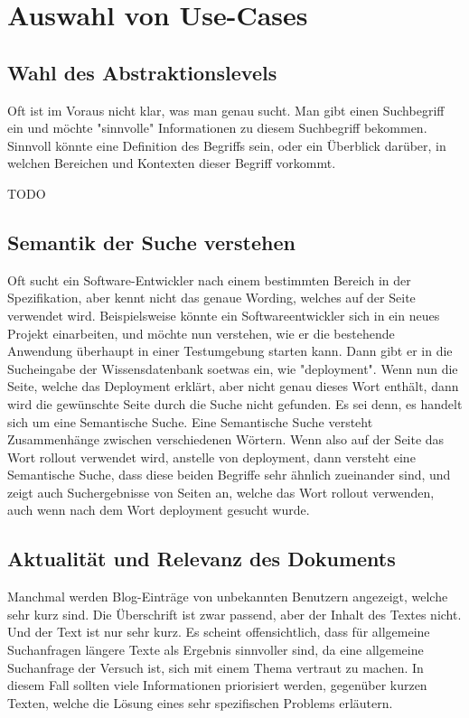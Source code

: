 \chapter{Auswahl von Use-Cases}

\section{Wahl des Abstraktionslevels}
Oft ist im Voraus nicht klar, was man genau sucht. Man gibt einen Suchbegriff ein und möchte "sinnvolle" Informationen zu diesem Suchbegriff bekommen. Sinnvoll könnte eine Definition des Begriffs sein, oder ein Überblick darüber, in welchen Bereichen und Kontexten dieser Begriff vorkommt.

TODO

\section{Semantik der Suche verstehen}
Oft sucht ein Software-Entwickler nach einem bestimmten Bereich in der Spezifikation, aber kennt nicht das genaue Wording, welches auf der Seite verwendet wird. Beispielsweise könnte ein Softwareentwickler sich in ein neues Projekt einarbeiten, und möchte nun verstehen, wie er die bestehende Anwendung überhaupt in einer Testumgebung starten kann. Dann gibt er in die Sucheingabe der Wissensdatenbank soetwas ein, wie "deployment". Wenn nun die Seite, welche das Deployment erklärt, aber nicht genau dieses Wort enthält, dann wird die gewünschte Seite durch die Suche nicht gefunden. Es sei denn, es handelt sich um eine Semantische Suche.
Eine Semantische Suche versteht Zusammenhänge zwischen verschiedenen Wörtern. Wenn also auf der Seite das Wort rollout verwendet wird, anstelle von deployment, dann versteht eine Semantische Suche, dass diese beiden Begriffe sehr ähnlich zueinander sind, und zeigt auch Suchergebnisse von Seiten an, welche das Wort rollout verwenden, auch wenn nach dem Wort deployment gesucht wurde.

\section{Aktualität und Relevanz des Dokuments}
Manchmal werden Blog-Einträge von unbekannten Benutzern angezeigt, welche sehr kurz sind. Die Überschrift ist zwar passend, aber der Inhalt des Textes nicht. Und der Text ist nur sehr kurz. Es scheint offensichtlich, dass für allgemeine Suchanfragen längere Texte als Ergebnis sinnvoller sind, da eine allgemeine Suchanfrage der Versuch ist, sich mit einem Thema vertraut zu machen. In diesem Fall sollten viele Informationen priorisiert werden, gegenüber kurzen Texten, welche die Lösung eines sehr spezifischen Problems erläutern.

